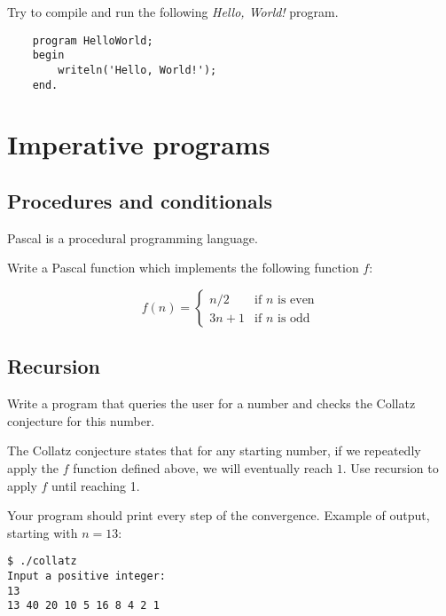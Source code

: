 \documentclass{../../tp}
\begin{document}
\begin{instruction}
	Try to compile and run the following \emph{Hello, World!} program.
	
	\begin{verbatim}
	program HelloWorld;
	begin 
		writeln('Hello, World!');
	end.
	\end{verbatim}
\end{instruction}

\section{Imperative programs}

\subsection{Procedures and conditionals}

Pascal is a procedural programming language. 

\begin{instruction}
	Write a Pascal function which implements the following function $f$:
		
	\begin{equation*}
		f(n) = 
			\begin{cases}
				n/2 & \text{if $n$ is even} \\
				3n + 1 & \text{if $n$ is odd} 
			\end{cases}
	\end{equation*}
\end{instruction}

\subsection{Recursion}
\begin{instruction}
Write a program that queries the user for a number and checks the Collatz conjecture for this number.

The Collatz conjecture states that for any starting number,  if we repeatedly apply the $f$ function defined above, we will eventually reach $1$. Use recursion to apply $f$ until reaching 1. 

Your program should print every step of the convergence. Example of output, starting with $n = 13$: 
\begin{verbatim}
$ ./collatz
Input a positive integer:
13
13 40 20 10 5 16 8 4 2 1
\end{verbatim}
\end{instruction}
\end{document}
